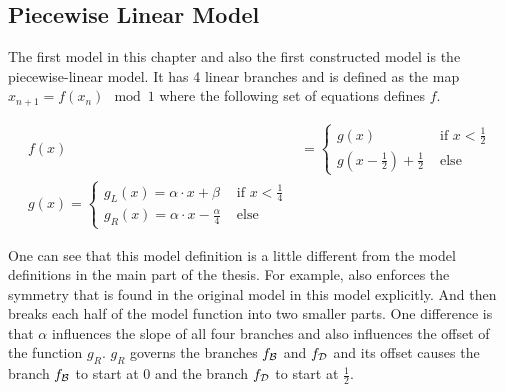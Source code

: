 \subsection{Piecewise Linear Model}

The first model in this chapter and also the first constructed model is the piecewise-linear model.
It has 4 linear branches and is defined as the map $x_{n+1} = f(x_n) \mod 1$ where the following set of equations defines $f$.

\begin{align}
	f(x) & = \begin{cases}
		         g(x)                                        & \text{ if } x < \frac{1}{2} \\
		         g\left(x - \frac{1}{2}\right) + \frac{1}{2} & \text{ else}
	         \end{cases} \label{equ:app.model.lin.f} \\
	g(x) = \begin{cases}
		       g_L(x) = \alpha \cdot x + \beta            & \text{ if } x < \frac{1}{4} \\
		       g_R(x) = \alpha \cdot x - \frac{\alpha}{4} & \text{ else}
	       \end{cases} \label{equ:app.model.lin.g}
\end{align}

One can see that this model definition is a little different from the model definitions in the main part of the thesis.
For example,  also enforces the symmetry that is found in the original model in this model explicitly.
And  then breaks each half of the model function into two smaller parts.
One difference is that $\alpha$ influences the slope of all four branches and also influences the offset of the function $g_R$.
$g_R$ governs the branches $f_{\mathcal{B}}$ and $f_{\mathcal{D}}$ and its offset causes the branch $f_{\mathcal{B}}$ to start at $0$ and the branch $f_{\mathcal{D}}$ to start at $\frac{1}{2}$.

